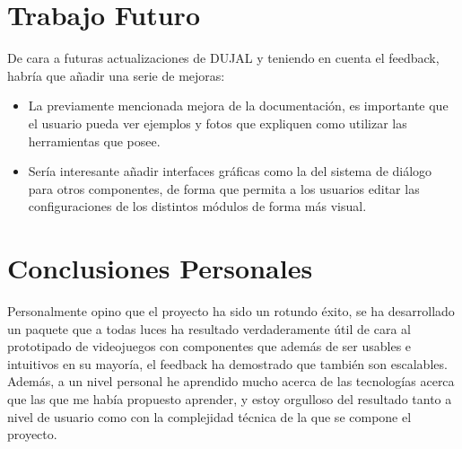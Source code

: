 \section{Trabajo Futuro}

De cara a futuras actualizaciones de DUJAL y teniendo en cuenta el feedback, habría que añadir una serie de mejoras: 
\begin{itemize}
    \item La previamente mencionada mejora de la documentación, es importante que el usuario pueda ver ejemplos y fotos que expliquen como utilizar las herramientas que posee.
    \item Sería interesante añadir interfaces gráficas como la del sistema de diálogo para otros componentes, de forma que permita a los usuarios editar las configuraciones de los distintos módulos 
    de forma más visual.
\end{itemize}

\section{Conclusiones Personales}
Personalmente opino que el proyecto ha sido un rotundo éxito, se ha desarrollado un paquete que a todas luces ha resultado verdaderamente útil de cara al prototipado de
 videojuegos con componentes que además de ser usables e intuitivos en su mayoría, el feedback ha demostrado que también son escalables. Además, a un nivel personal he aprendido mucho acerca
  de las tecnologías acerca que las que me había propuesto aprender, y estoy orgulloso del resultado tanto a nivel de usuario como con la complejidad técnica de la que se compone el proyecto. 